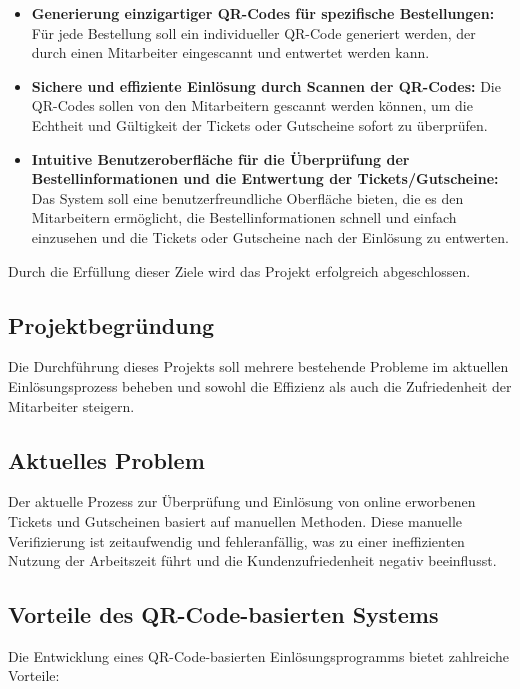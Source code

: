 \begin{itemize}
    \item \textbf{Generierung einzigartiger QR-Codes für spezifische Bestellungen:} Für jede Bestellung soll ein individueller QR-Code generiert werden, der durch einen Mitarbeiter eingescannt und entwertet werden kann.
    \item \textbf{Sichere und effiziente Einlösung durch Scannen der QR-Codes:} Die QR-Codes sollen von den Mitarbeitern gescannt werden können, um die Echtheit und Gültigkeit der Tickets oder Gutscheine sofort zu überprüfen.
    \item \textbf{Intuitive Benutzeroberfläche für die Überprüfung der Bestellinformationen und die Entwertung der Tickets/Gutscheine:} Das System soll eine benutzerfreundliche Oberfläche bieten, die es den Mitarbeitern ermöglicht, die Bestellinformationen schnell und einfach einzusehen und die Tickets oder Gutscheine nach der Einlösung zu entwerten.
\end{itemize}

Durch die Erfüllung dieser Ziele wird das Projekt erfolgreich abgeschlossen.

\subsection{Projektbegründung} 
\label{sec:Projektbegruendung}

Die Durchführung dieses Projekts soll mehrere bestehende Probleme im aktuellen Einlösungsprozess beheben und sowohl die Effizienz als auch die Zufriedenheit der Mitarbeiter steigern.

\subsection{Aktuelles Problem}
Der aktuelle Prozess zur Überprüfung und Einlösung von online erworbenen Tickets und Gutscheinen basiert auf manuellen Methoden. Diese manuelle Verifizierung ist zeitaufwendig und fehleranfällig, was zu einer ineffizienten Nutzung der Arbeitszeit führt und die Kundenzufriedenheit negativ beeinflusst.

\subsection{Vorteile des QR-Code-basierten Systems}
Die Entwicklung eines QR-Code-basierten Einlösungsprogramms bietet zahlreiche Vorteile:

